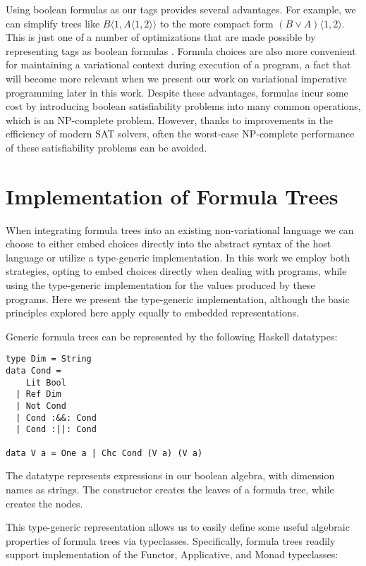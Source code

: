 \documentclass[onehalf,11pt]{beavtex}
\newcommand{\tagtree}[3]{#1 \langle #2, #3 \rangle}
\begin{document}
Using boolean formulas as our tags provides several advantages. For example, we can simplify trees like
$\tagtree{B}{1}{\tagtree{A}{1}{2}}$ to the more compact form $\tagtree{(B \vee A)}{1}{2}$. This is just
one of a number of optimizations that are made possible by representing tags as boolean formulas
\cite{walkingshaw2014projectional,hubbard2016formula}. Formula choices are also more convenient
for maintaining a variational context during execution of a program, a fact that will become
more relevant when we present our work on variational imperative programming later in
this work. Despite these advantages, formulas incur some cost by introducing boolean
satisfiability problems into many common operations, which is an NP-complete problem. However, thanks to improvements in the
efficiency of modern SAT solvers, often the worst-case NP-complete performance of these satisfiability
problems can be avoided.

\section{Implementation of Formula Trees}

When integrating formula trees into an existing non-variational language we can choose to
either embed choices directly into the abstract syntax of the host language or utilize a type-generic
implementation. In this work we employ both strategies, opting to embed choices directly when dealing
with programs, while using the type-generic implementation for the values produced by these programs.
Here we present the type-generic implementation, although the basic principles explored here apply
equally to embedded representations.

Generic formula trees can be represented by the following Haskell datatypes:

\begin{lstlisting}
type Dim = String
data Cond =
    Lit Bool
  | Ref Dim
  | Not Cond
  | Cond :&&: Cond
  | Cond :||: Cond

data V a = One a | Chc Cond (V a) (V a)
\end{lstlisting}

The datatype  represents expressions in our boolean algebra, with dimension names as strings.
The constructor  creates the leaves of a formula tree, while  creates the nodes.

This type-generic representation allows us to easily define some useful algebraic properties of
formula trees via typeclasses. Specifically, formula trees readily support implementation of the
Functor, Applicative, and Monad typeclasses:
\end{document}
